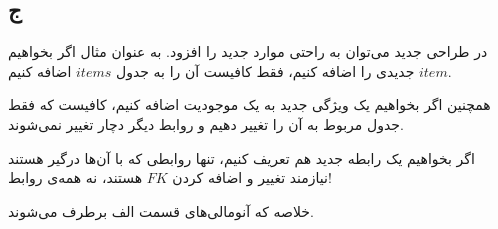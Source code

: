 \subsection*{ج}

در طراحی جدید می‌توان به راحتی موارد جدید را افزود. به عنوان مثال اگر بخواهیم $item$ جدیدی را اضافه کنیم، فقط کافیست آن را به جدول $items$ اضافه کنیم.

همچنین اگر بخواهیم یک ویژگی جدید به یک موجودیت اضافه کنیم، کافیست که فقط جدول مربوط به آن را تغییر دهیم و روابط دیگر دچار تغییر نمی‌شوند.

اگر بخواهیم یک رابطه جدید هم تعریف کنیم، تنها روابطی که با آن‌ها درگیر هستند نیازمند تغییر و اضافه کردن 
$FK$
هستند، نه همه‌ی روابط!

خلاصه که آنومالی‌های قسمت الف برطرف می‌شوند.








